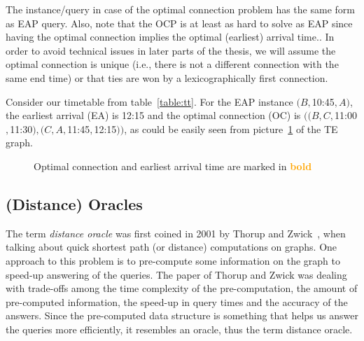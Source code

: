 	\noindent The instance/query in case of the optimal connection problem has the same form as EAP query. Also, note that the OCP is at least as hard to solve as EAP since having the optimal connection implies the optimal (earliest) arrival time.. In order to avoid technical issues in later parts of the thesis, we will assume the optimal connection is unique (i.e., there is not a different connection with the same end time) or that ties are won by a lexicographically first connection. 
	
	\begin{example}
		Consider our timetable from table~\ref{table:tt}. For the EAP instance $(B, $10:45$, A)$, the earliest arrival (EA) is 12:15 and the optimal connection (OC) is $((B, C, $11:00$, $11:30$), (C, A, $11:45$, $12:15$))$, as could be easily seen from picture~\ref{pic:ea} of the TE graph.
	\end{example}

	\begin{figure}[h!]
	    \begin{center}
	    \end{center}
    	\caption{\label{pic:ea} Optimal connection and earliest arrival time are marked in \textcolor{orange}{\textbf{bold}}}
	\end{figure}
	
\subsection{(Distance) Oracles}

	The term \textit{distance oracle} was first coined in 2001 by Thorup and Zwick~\cite{apxdo05}, when talking about quick shortest path (or distance) computations on graphs. One approach to this problem is to pre-compute some information on the graph to speed-up answering of the queries. The paper of Thorup and Zwick was dealing with trade-offs among the time complexity of the pre-computation, the amount of pre-computed information, the speed-up in query times and the accuracy of the answers. Since the pre-computed data structure is something that helps us answer the queries more efficiently, it resembles an oracle, thus the term distance oracle.

